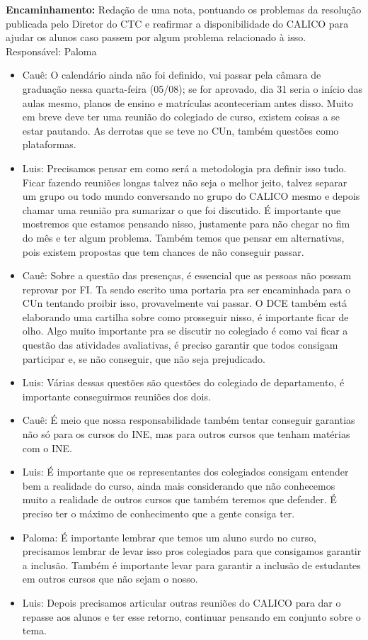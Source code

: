 \documentclass{ata-calico}
\begin{document}
\textbf{Encaminhamento:} Redação de uma nota, pontuando os problemas da resolução publicada pelo Diretor do CTC e reafirmar a disponibilidade do CALICO para ajudar os alunos caso passem por algum problema relacionado à isso. Responsável: Paloma

\begin{itemize}
\item Cauê: O calendário ainda não foi definido, vai passar pela câmara de graduação nessa quarta-feira (05/08); se for aprovado, dia 31 seria o início das aulas mesmo, planos de ensino e matrículas aconteceriam antes disso. Muito em breve deve ter uma reunião do colegiado de curso, existem coisas a se estar pautando. As derrotas que se teve no CUn, também questões como plataformas.
\item Luis: Precisamos pensar em como será a metodologia pra definir isso tudo. Ficar fazendo reuniões longas talvez não seja o melhor jeito, talvez separar um grupo ou todo mundo conversando no grupo do CALICO mesmo e depois chamar uma reunião pra sumarizar o que foi discutido. É importante que mostremos que estamos pensando nisso, justamente para não chegar no fim do mês e ter algum problema. Também temos que pensar em alternativas, pois existem propostas que tem chances de não conseguir passar.
\item Cauê: Sobre a questão das presenças, é essencial que as pessoas não possam reprovar por FI. Ta sendo escrito uma portaria pra ser encaminhada para o CUn tentando proibir isso, provavelmente vai passar. O DCE também está elaborando uma cartilha sobre como prosseguir nisso, é importante ficar de olho. Algo muito importante pra se discutir no colegiado é como vai ficar a questão das atividades avaliativas, é preciso garantir que todos consigam participar e, se não conseguir, que não seja prejudicado.
\item Luis: Várias dessas questões são questões do colegiado de departamento, é importante conseguirmos reuniões dos dois.
\item Cauê: É meio que nossa responsabilidade também tentar conseguir garantias não só para os cursos do INE, mas para outros cursos que tenham matérias com o INE.
\item Luis: É importante que os representantes dos colegiados consigam entender bem a realidade do curso, ainda mais considerando que não conhecemos muito a realidade de outros cursos que também teremos que defender. É preciso ter o máximo de conhecimento que a gente consiga ter.
\item Paloma: É importante lembrar que temos um aluno surdo no curso, precisamos lembrar de levar isso pros colegiados para que consigamos garantir a inclusão. Também é importante levar para garantir a inclusão de estudantes em outros cursos que não sejam o nosso.
\item Luis: Depois precisamos articular outras reuniões do CALICO para dar o repasse aos alunos e ter esse retorno, continuar pensando em conjunto sobre o tema.
\end{itemize}
\end{document}
